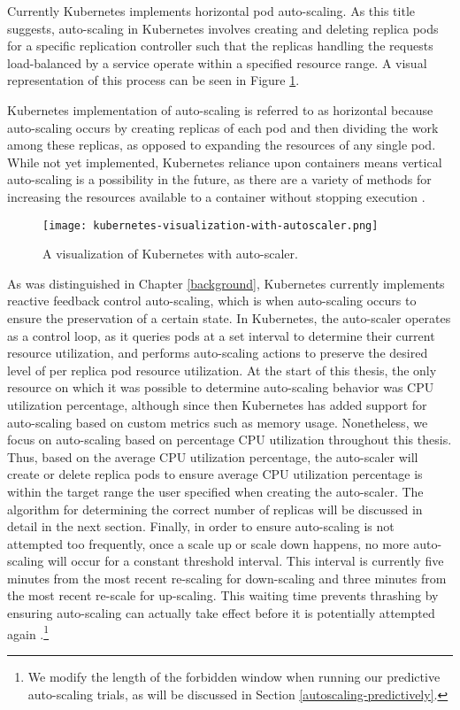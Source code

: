 Currently Kubernetes implements horizontal pod auto-scaling.
As this title suggests, auto-scaling in
Kubernetes involves creating and deleting replica pods for a specific replication
controller such that the replicas handling the requests load-balanced by a service
operate within a specified resource range. A visual representation of this
process can be seen in Figure \ref{fig:kubernetes-visualization-with-autoscaler}.

Kubernetes implementation of auto-scaling is referred to as horizontal because
auto-scaling occurs by creating replicas of each pod and then dividing the work
among these replicas, as opposed to expanding the resources of any single pod.
While not yet implemented, Kubernetes reliance upon containers means vertical
auto-scaling is a possibility in the future, as there are a variety of
methods for increasing the resources available to a container without stopping
execution \cite{docker-up-and-running}.

\begin{figure}[!h]
  \centerline{\texttt{[image: kubernetes-visualization-with-autoscaler.png]}}
  \caption{A visualization of Kubernetes with auto-scaler.}
  \label{fig:kubernetes-visualization-with-autoscaler}
\end{figure}

As was distinguished in Chapter \ref{background}, Kubernetes currently implements reactive
feedback control auto-scaling, which is when auto-scaling occurs to
ensure the preservation of a certain state.
In Kubernetes, the auto-scaler operates as a control loop,
as it queries pods at a set interval to determine
their current resource utilization, and performs auto-scaling actions to
preserve the desired level of per replica pod resource utilization.
At the start of this thesis, the only resource on which it was possible to
determine auto-scaling behavior was CPU utilization percentage, although since
then Kubernetes has added support for auto-scaling based on custom metrics such
as memory usage. Nonetheless, we focus on auto-scaling based on percentage CPU
utilization throughout this thesis.
Thus, based on the average CPU utilization percentage, the
auto-scaler will create or delete replica pods to ensure average CPU utilization
percentage is within the target range the user specified when creating the
auto-scaler. The algorithm for determining the correct number of replicas
will be discussed in detail in the next section. Finally,
in order to ensure auto-scaling is not attempted too frequently, once a
scale up or scale down happens, no more auto-scaling will occur for a constant
threshold interval. This interval is currently five minutes from the most recent
re-scaling for down-scaling and three minutes from the most recent re-scale for
up-scaling. This waiting time prevents thrashing by ensuring
auto-scaling can actually take effect before it is potentially attempted again
\cite{k8s-horizontal-pod-autoscaler-user-guide}.\footnote{We modify the length
of the forbidden window when running our predictive auto-scaling trials, as will
be discussed in Section \ref{autoscaling-predictively}.}
